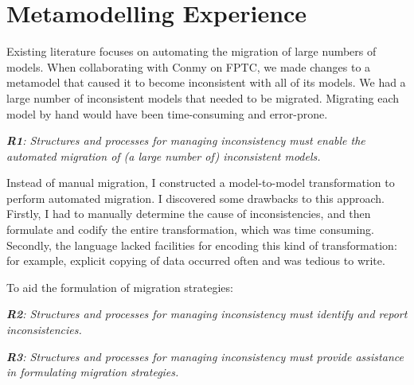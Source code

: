 \documentclass[a4paper]{article}
\begin{document}



\section{Metamodelling Experience}

Existing literature focuses on automating the migration of large numbers of models. When collaborating with Conmy on FPTC, we made changes to a metamodel that caused it to become inconsistent with all of its models. We had a large number of inconsistent models that needed to be migrated. Migrating each model by hand would have been time-consuming and error-prone.

\emph{\textbf{R1}: Structures and processes for managing inconsistency must enable the automated migration of (a large number of) inconsistent models.}

Instead of manual migration, I constructed a model-to-model transformation to perform automated migration. I discovered some drawbacks to this approach. Firstly, I had to manually determine the cause of inconsistencies, and then formulate and codify the entire transformation, which was time consuming. Secondly, the language lacked facilities for encoding this kind of transformation: for example, explicit copying of data occurred often and was tedious to write.

To aid the formulation of migration strategies:

\emph{\textbf{R2}: Structures and processes for managing inconsistency must identify and report inconsistencies.}

\emph{\textbf{R3}: Structures and processes for managing inconsistency must provide assistance in formulating migration strategies.}
\end{document}

